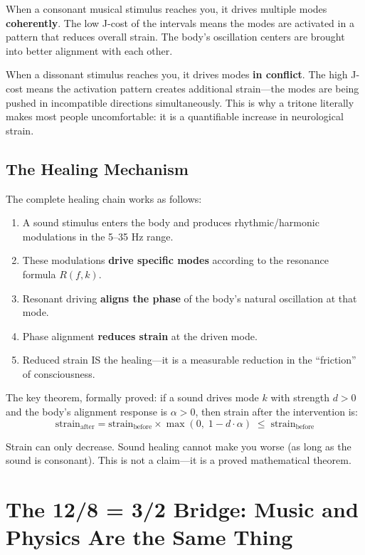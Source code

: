 \documentclass[11pt,a4paper]{article}
\begin{document}
When a consonant musical stimulus reaches you, it drives multiple modes \textbf{coherently}. The low J-cost of the intervals means the modes are activated in a pattern that reduces overall strain. The body's oscillation centers are brought into better alignment with each other.

When a dissonant stimulus reaches you, it drives modes \textbf{in conflict}. The high J-cost means the activation pattern creates additional strain---the modes are being pushed in incompatible directions simultaneously. This is why a tritone literally makes most people uncomfortable: it is a quantifiable increase in neurological strain.

\subsection{The Healing Mechanism}

The complete healing chain works as follows:

\begin{enumerate}
    \item A sound stimulus enters the body and produces rhythmic/harmonic modulations in the 5--35 Hz range.
    \item These modulations \textbf{drive specific modes} according to the resonance formula $R(f, k)$.
    \item Resonant driving \textbf{aligns the phase} of the body's natural oscillation at that mode.
    \item Phase alignment \textbf{reduces strain} at the driven mode.
    \item Reduced strain IS the healing---it is a measurable reduction in the ``friction'' of consciousness.
\end{enumerate}

The key theorem, formally proved: if a sound drives mode $k$ with strength $d > 0$ and the body's alignment response is $\alpha > 0$, then strain after the intervention is:
\[
\text{strain}_{\text{after}} = \text{strain}_{\text{before}} \times \max(0, \; 1 - d \cdot \alpha) \; \leq \; \text{strain}_{\text{before}}
\]

Strain can only decrease. Sound healing cannot make you worse (as long as the sound is consonant). This is not a claim---it is a proved mathematical theorem.

\section{The 12/8 = 3/2 Bridge: Music and Physics Are the Same Thing}
\end{document}
